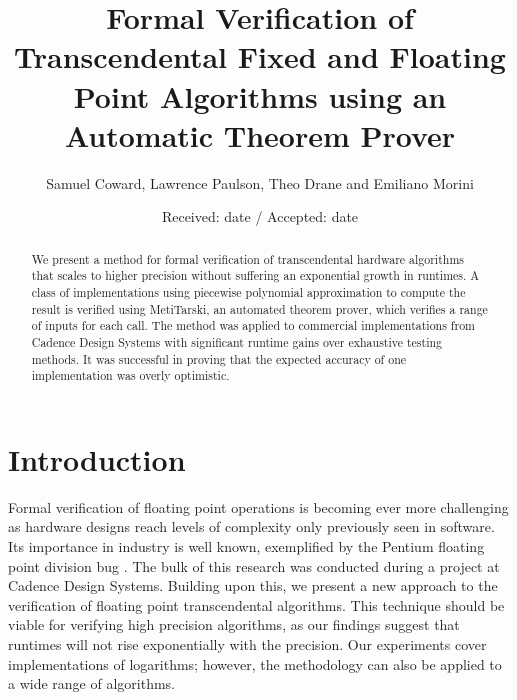 \documentclass[smallcondensed]{svjour3}
\begin{document}
\title{Formal Verification of Transcendental Fixed and Floating Point Algorithms using an Automatic Theorem Prover
}
\author{Samuel Coward, Lawrence Paulson, Theo Drane and Emiliano Morini
}
\date{Received: date / Accepted: date}


\maketitle

\begin{abstract}
We present a method for formal verification of transcendental hardware algorithms that scales to higher precision without suffering an exponential growth in runtimes. A class of implementations using piecewise polynomial approximation to compute the result is verified using MetiTarski, an automated theorem prover, which verifies a range of inputs for each call. The method was applied to commercial implementations from Cadence Design Systems with significant runtime gains over exhaustive testing methods. It was successful in proving that the expected accuracy of one implementation was overly optimistic.
\end{abstract}

\section{Introduction}
\label{intro}
Formal verification of floating point operations is becoming ever more challenging as hardware designs reach levels of complexity only previously seen in software. Its importance in industry is well known, exemplified by the Pentium floating point division bug \cite{pratt1995anatomy}. The bulk of this research was conducted during a project at Cadence Design Systems. Building upon this, we present a new approach to the verification of floating point transcendental algorithms. This technique should be viable for verifying high precision algorithms, as our findings suggest that runtimes will not rise exponentially with the precision.  Our experiments cover implementations of logarithms; however, the methodology can also be applied to a wide range of algorithms. 
\end{document}
